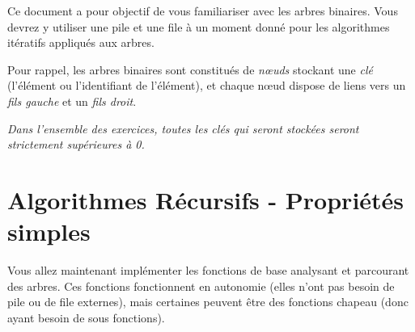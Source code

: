 \documentclass[11pt,a4paper]{article}
\begin{document}
\EncadreTitre

\bigskip


%
%

\bigskip


Ce document a pour objectif de vous familiariser avec les arbres binaires.
Vous devrez y utiliser une pile et une file à un moment donné pour les algorithmes itératifs appliqués aux arbres.

\bigskip

Pour rappel, les arbres binaires sont constitués de \textit{nœuds} stockant une \textit{clé} (l'élément ou l'identifiant de l'élément), et chaque nœud dispose de liens vers un \textit{fils gauche} et un \textit{fils droit}.

\medskip

\textit{Dans l'ensemble des exercices, toutes les clés qui seront stockées seront strictement supérieures à 0.}

\bigskip


\section{Algorithmes Récursifs - Propriétés simples}

\bigskip

Vous allez maintenant implémenter les fonctions de base analysant et parcourant des arbres.
Ces fonctions fonctionnent en autonomie (elles n'ont pas besoin de pile ou de file externes), mais certaines peuvent être des fonctions chapeau (donc ayant besoin de sous fonctions).

\bigskip
\end{document}
